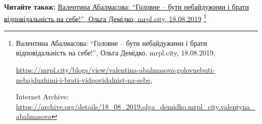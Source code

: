  
 
 
 
 

\def\pubIA{https://archive.org/details/18_08_2019.olga_demidko.mrpl_city.valentyna_abalmasova}
\def\pubTitle{Валентина Абалмасова: \enquote{Головне – бути небайдужими і брати відповідальність на себе!}}
\def\pubDate{18.08.2019}
\def\pubOrigin{https://mrpl.city/blogs/view/valentina-abalmasova-golovnebuti-nebajduzhimi-i-brati-vidpovidalnist-na-sebe}
\def\pubAuthor{Ольга Демідко}

\textbf{Читайте також:} \href{\pubIA}{%
\pubTitle, \pubAuthor, mrpl.city, \pubDate}%
\footnote{\pubTitle, \pubAuthor, mrpl.city, \pubDate, \par\url{\pubOrigin}, \par Internet Archive: \url{\pubIA}}
